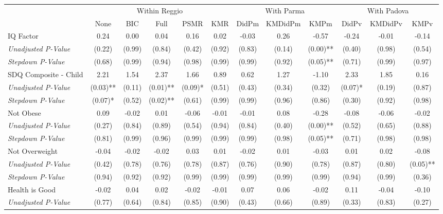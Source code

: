 \begin{tabular}{l c c c c c c c c c c c}
\toprule
& \multicolumn{5}{c}{Within Reggio} & \multicolumn{3}{c}{With Parma} & \multicolumn{3}{c}{With Padova} \\\cmidrule(lr){2-6} \cmidrule(lr){7-9} \cmidrule(lr){10-12}
 & None & BIC & Full & PSMR & KMR & DidPm & KMDidPm & KMPm & DidPv & KMDidPv & KMPv \\
\midrule
IQ Factor & 0.24 & 0.00 & 0.04 & 0.16 & 0.02 & -0.03 & 0.26 & -0.57 & -0.24 & -0.01 & -0.14 \\
\quad \textit{Unadjusted P-Value} & (0.22) & (0.99) & (0.84) & (0.42) & (0.92) & (0.83) & (0.14) & (0.00)** & (0.40) & (0.98) & (0.54) \\
\quad \textit{Stepdown P-Value} & (0.68) & (0.99) & (0.94) & (0.98) & (0.99) & (0.99) & (0.92) & (0.05)** & (0.71) & (0.99) & (0.97) \\
SDQ Composite - Child & 2.21 & 1.54 & 2.37 & 1.66 & 0.89 & 0.62 & 1.27 & -1.10 & 2.33 & 1.85 & 0.16 \\
\quad \textit{Unadjusted P-Value} & (0.03)** & (0.11) & (0.01)** & (0.09)* & (0.51) & (0.43) & (0.34) & (0.32) & (0.07)* & (0.19) & (0.87) \\
\quad \textit{Stepdown P-Value} & (0.07)* & (0.52) & (0.02)** & (0.61) & (0.99) & (0.99) & (0.96) & (0.86) & (0.30) & (0.92) & (0.98) \\
Not Obese & 0.09 & -0.02 & 0.01 & -0.06 & -0.01 & -0.01 & 0.08 & -0.28 & -0.08 & -0.06 & -0.02 \\
\quad \textit{Unadjusted P-Value} & (0.27) & (0.84) & (0.89) & (0.54) & (0.94) & (0.84) & (0.40) & (0.00)** & (0.52) & (0.65) & (0.88) \\
\quad \textit{Stepdown P-Value} & (0.81) & (0.99) & (0.96) & (0.99) & (0.99) & (0.99) & (0.98) & (0.05)** & (0.71) & (0.98) & (0.98) \\
Not Overweight & -0.04 & -0.02 & -0.02 & 0.03 & 0.01 & -0.02 & 0.01 & -0.03 & 0.01 & 0.02 & -0.08 \\
\quad \textit{Unadjusted P-Value} & (0.42) & (0.78) & (0.76) & (0.78) & (0.87) & (0.76) & (0.90) & (0.78) & (0.87) & (0.80) & (0.05)** \\
\quad \textit{Stepdown P-Value} & (0.94) & (0.92) & (0.92) & (0.99) & (0.99) & (0.99) & (0.99) & (0.99) & (0.94) & (0.99) & (0.36) \\
Health is Good & -0.02 & 0.04 & 0.02 & -0.02 & -0.01 & 0.07 & 0.06 & -0.02 & 0.11 & -0.04 & -0.10 \\
\quad \textit{Unadjusted P-Value} & (0.77) & (0.64) & (0.84) & (0.85) & (0.90) & (0.43) & (0.66) & (0.89) & (0.33) & (0.83) & (0.27) \\

\end{tabular}
